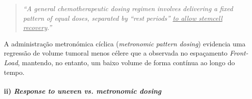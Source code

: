 \vspace{-1.25em}
\begin{quote}
    \textit{``A general chemotherapeutic dosing regimen involves delivering a fixed pattern of equal doses, separated by ``rest periods'' \underline{to allow stemcell recovery}.''}\cite{Hahnfeldt2003-oy}
\end{quote}

A administração metronómica cíclica (\textit{metronomic pattern dosing}) evidencia uma regressão de volume tumoral menos célere que a observada no espaçamento \textit{Front-Load}, mantendo, no entanto, um baixo volume de forma contínua ao longo do tempo.

\paragraph{ii) \textit{Response to uneven vs. metronomic dosing}}\mbox{}\\
\vspace{-2em}
\label{subsubsubsec:amplitude-variation}
